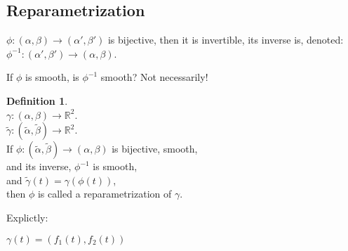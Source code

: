 \documentclass[twocolumn,20pt,fleqn]{extarticle}
\theoremstyle{plain}
\theoremstyle{definition}
\newtheorem*{definition}{Definition}
\theoremstyle{remark}
\begin{document}
\clearpage


\subsection{Reparametrization}
$\phi: (\alpha,\beta) \to (\alpha',\beta')$ is bijective, then it is invertible, its inverse is,
denoted: $\phi^{-1} : (\alpha',\beta') \to (\alpha,\beta)$.

If $\phi$ is smooth, is $\phi^{-1}$ smooth? Not necessarily!



\begin{definition}~\\
  $\gamma : (\alpha, \beta) \to \mathbb{R}^2$.\\
  $\tilde{\gamma} : (\tilde{\alpha}, \tilde{\beta}) \to \mathbb{R}^2$.\\
  If $\phi : (\tilde{\alpha}, \tilde{\beta})\to (\alpha, \beta)$ is bijective, smooth, \\and its inverse, $\phi^{-1}$ is smooth,\\ and
 $\tilde{\gamma}(t) = \gamma(\phi(t))$,\\ then $\phi$ is called a reparametrization of $\gamma$.
\end{definition}

Explictly:

$\gamma(t) = (f_1(t), f_2(t))$


\newpage
\end{document}
